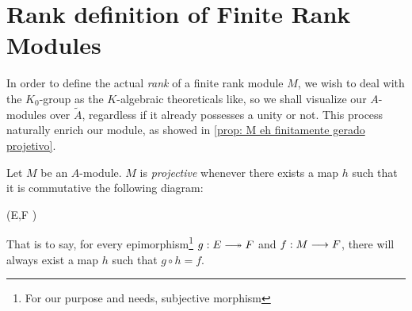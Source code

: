 \section{Rank definition of Finite Rank Modules}
In order to define the actual \textit{rank} of a finite rank module $M$, we wish to deal with the $K_0$-group as the $K$-algebraic theoreticals like, so we shall visualize our $A$-modules over $\widetilde A$, regardless if it already possesses a unity or not. This process naturally enrich our module, as showed in \ref{prop: M eh finitamente gerado projetivo}.

\begin{definicao}
Let $M$ be an $A$-module. $M$ is \textit{projective} whenever there exists a map $h$ such that it is commutative the following diagram:
\begin{eqspaced*}{(E,F \in {})}
\end{eqspaced*}
That is to say, for every epimorphism\footnote{For our purpose and needs, subjective morphism} $g: E \longtwoheadrightarrow F$ and $f:M \longrightarrow F$, there will always exist a map $h$ such that $g\circ h = f$.
\end{definicao}

